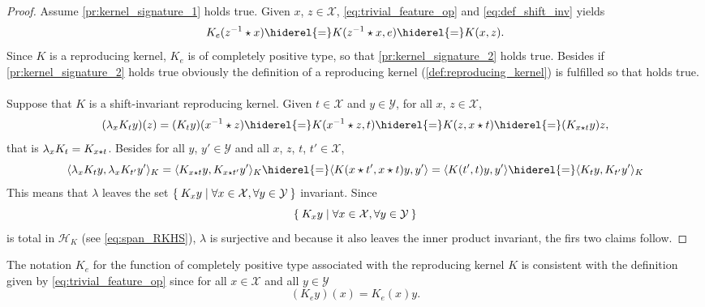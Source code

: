 \begin{proof} Assume \cref{pr:kernel_signature_1} holds true. Given $x$, $z\in\mathcal{X}$, \cref{eq:trivial_feature_op} and \cref{eq:def_shift_inv} yields
\begin{dmath*}
K_e(\inv{z}\groupop x)\hiderel{=}K(\inv{z} \groupop x,e)\hiderel{=}K(x,z).
\end{dmath*}
Since $K$ is a reproducing kernel, $K_e$ is of completely positive type, so that \cref{pr:kernel_signature_2} holds true. Besides if \cref{pr:kernel_signature_2} holds true obviously the definition of a reproducing kernel (\cref{def:reproducing_kernel}) is fulfilled so that \label{pr:kernel_signature_1} holds true.
\paragraph{}
Suppose that $K$ is a shift-invariant reproducing kernel. Given $t\in\mathcal{X}$ and $y\in\mathcal{Y}$, for all $x$, $z\in\mathcal{X}$,
\begin{dmath*}
(\lambda_xK_ty)(z)=(K_ty)(\inv{x}\groupop z)\hiderel{=}K(\inv{x}\groupop z,t)\hiderel{=}K(z,x\groupop t)\hiderel{=}(K_{x\groupop t}y)z,
\end{dmath*}
that is $\lambda_xK_t=K_{x\star t}$. Besides for all $y$, $y'\in\mathcal{Y}$ and all $x$, $z$, $t$, $t'\in\mathcal{X}$,
\begin{dmath*}
\inner{\lambda_xK_ty, \lambda_xK_{t'}y'}_K=\inner{K_{x\groupop t}y, K_{x \groupop t'}y'}_K\hiderel{=}\inner{K(x \groupop t', x \groupop t)y,y'}=\inner{K(t',t)y, y'}\hiderel{=}\inner{K_ty, K_{t'}y'}_K
\end{dmath*}
This means that $\lambda$ leaves the set $\Set{K_xy|\forall x\in\mathcal{X}, \forall y\in\mathcal{Y}}$ invariant.
Since \begin{dmath*}
\Set{K_xy|\forall x\in\mathcal{X}, \forall y\in\mathcal{Y}}
\end{dmath*}
is total in $\mathcal{H}_K$ (see \cref{eq:span_RKHS}), $\lambda$ is surjective and because it also leaves the inner product invariant, the firs two claims follow.
\end{proof}
The notation $K_e$ for the function of completely positive type associated with the reproducing kernel $K$
is consistent with the definition given by \cref{eq:trivial_feature_op} since for all $x\in\mathcal{X}$ and all $y\in\mathcal{Y}$
\begin{dmath*}
(K_ey)(x)=K_e(x)y.
\end{dmath*}

